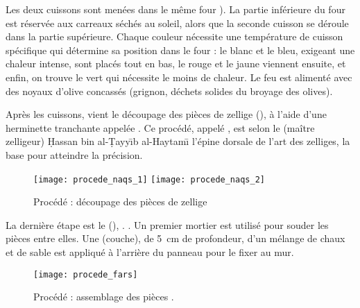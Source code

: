 Les deux cuissons sont menées dans le même four \farina). 
La partie inférieure du four est réservée aux carreaux séchés au 
soleil, alors que la seconde cuisson se déroule dans la partie 
supérieure. Chaque couleur nécessite une température de cuisson 
spécifique qui détermine sa position dans le four : le blanc et 
le bleu, exigeant une chaleur intense, sont placés tout en bas, le 
rouge et le jaune viennent ensuite, et enfin, on trouve le vert qui 
nécessite le moins de chaleur. Le feu est alimenté avec des noyaux 
d'olive concassés (grignon, déchets solides du broyage des olives).

Après les cuissons, vient le découpage des pièces de zellige 
(), à l'aide d'une herminette tranchante 
appelée \manqas. Ce procédé, appelé \naqs, 
est selon le \zlaygi (maître zelligeur) \d{H}assan bin 
al-\d{T}ayy\={\i}b al-Haytam\={\i} l'épine dorsale de l'art des 
zelliges, la base pour atteindre la précision.

\begin{figure}[htb]
  \texttt{[image: procede\_naqs\_1]}%
  \quad%
  \texttt{[image: procede\_naqs\_2]}%
  \caption[Procédé \naqs : découpage des pièces de zellige]
          {Procédé \naqs : découpage des pièces de zellige 
           \autocite{Castera_1996}}
  \label{fig:procede_naqs}
\end{figure}

La dernière étape est le \fars (), 
. \autocite{Damluji_1993a}.
Un premier mortier est utilisé pour souder les pièces entre elles. 
Une \tafrisa (couche), de \SI{5}{\cm} de profondeur, 
d'un mélange de chaux et de sable est appliqué à l'arrière du panneau 
pour le fixer au mur.

\begin{figure}[htb]
  \texttt{[image: procede\_fars]}%
  \caption{Procédé \fars : assemblage des pièces 
           \autocite{Castera_1996}.}
  \label{fig:procede_fars}
\end{figure}


